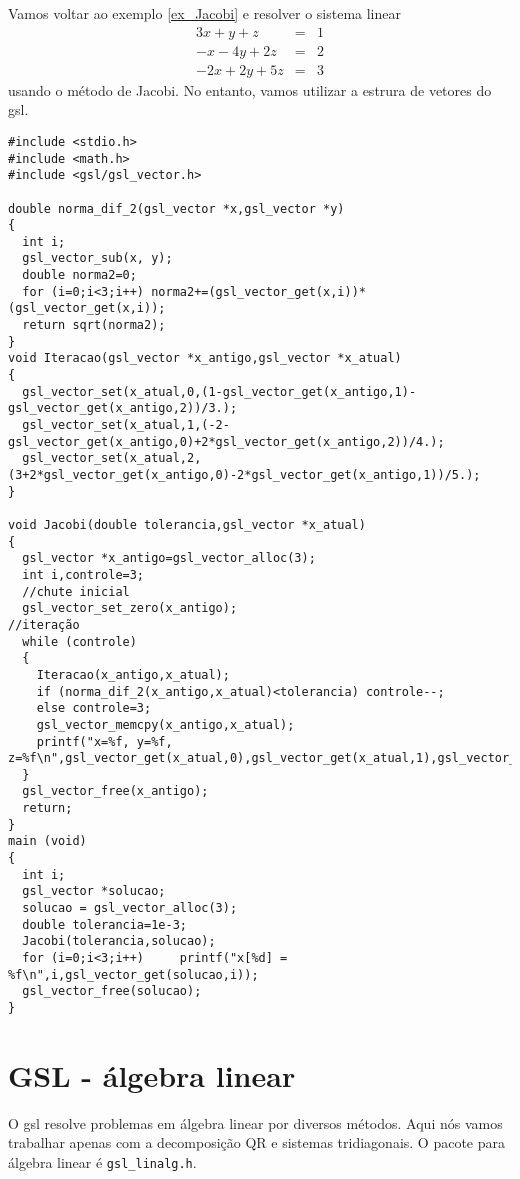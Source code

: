 \begin{ex}Vamos voltar ao exemplo \ref{ex_Jacobi} e resolver o sistema linear
 \begin{eqnarray*}
3x+y+z&=&1\\
-x-4y+2z&=&2\\
-2x+2y+5z&=&3
\end{eqnarray*}
usando o método de Jacobi. No entanto, vamos utilizar a estrura de vetores do gsl.
\end{ex}
\begin{verbatim}
#include <stdio.h>
#include <math.h>
#include <gsl/gsl_vector.h>

double norma_dif_2(gsl_vector *x,gsl_vector *y)
{
  int i;
  gsl_vector_sub(x, y);
  double norma2=0;
  for (i=0;i<3;i++) norma2+=(gsl_vector_get(x,i))*(gsl_vector_get(x,i));
  return sqrt(norma2);
}
void Iteracao(gsl_vector *x_antigo,gsl_vector *x_atual)
{
  gsl_vector_set(x_atual,0,(1-gsl_vector_get(x_antigo,1)-gsl_vector_get(x_antigo,2))/3.);
  gsl_vector_set(x_atual,1,(-2-gsl_vector_get(x_antigo,0)+2*gsl_vector_get(x_antigo,2))/4.);
  gsl_vector_set(x_atual,2,(3+2*gsl_vector_get(x_antigo,0)-2*gsl_vector_get(x_antigo,1))/5.);
}

void Jacobi(double tolerancia,gsl_vector *x_atual)
{
  gsl_vector *x_antigo=gsl_vector_alloc(3);
  int i,controle=3;
  //chute inicial
  gsl_vector_set_zero(x_antigo);
//iteração
  while (controle)
  {
    Iteracao(x_antigo,x_atual);
    if (norma_dif_2(x_antigo,x_atual)<tolerancia) controle--;
    else controle=3;
    gsl_vector_memcpy(x_antigo,x_atual);
    printf("x=%f, y=%f, z=%f\n",gsl_vector_get(x_atual,0),gsl_vector_get(x_atual,1),gsl_vector_get(x_atual,2));
  }
  gsl_vector_free(x_antigo);
  return;
}
main (void)
{
  int i;
  gsl_vector *solucao;
  solucao = gsl_vector_alloc(3);
  double tolerancia=1e-3;
  Jacobi(tolerancia,solucao);
  for (i=0;i<3;i++)     printf("x[%d] = %f\n",i,gsl_vector_get(solucao,i));
  gsl_vector_free(solucao);
}
\end{verbatim}





\section{GSL - álgebra linear}
O gsl resolve problemas em álgebra linear por diversos métodos. Aqui nós vamos trabalhar apenas com a decomposição QR e sistemas tridiagonais. O pacote para álgebra linear é \verb|gsl_linalg.h|.

